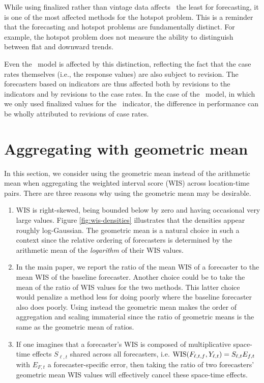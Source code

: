 While using finalized rather than vintage data affects \dv~the least for forecasting,
it is one of the most affected methods for the
hotspot problem. 
This is a reminder that the forecasting and hotspot problems are fundamentally
distinct.  For example, the hotspot problem does not measure
the ability to distinguish between flat and downward trends.

Even the \ar~model is affected by this distinction, reflecting the
fact that the case rates themselves (i.e., the response values) are also
subject to revision.  The forecasters based on indicators are thus
affected both by revisions to the indicators and by revisions to the
case rates.  In the case of the \gs~model, in which we only used finalized
values for the \gs~indicator, the difference in performance can be
wholly attributed to revisions of case rates.




\section{Aggregating with geometric mean}

In this section, we consider using the geometric mean instead of the
arithmetic mean when aggregating the weighted interval score (WIS) across
location-time pairs. 
There are three reasons why using the geometric mean may be desirable.
\begin{enumerate}
\item  WIS is right-skewed, being bounded below by zero and having
  occasional very large values.   Figure \ref{fig:wis-densities} illustrates that the
  densities appear roughly log-Gaussian.  The geometric mean is a
  natural choice in such a context since the relative ordering of forecasters is
  determined by the arithmetic mean of the {\em logarithm} of their WIS
  values.
\item In the main paper, we report the ratio of the mean WIS of a
  forecaster to the mean WIS of the baseline forecaster. Another
  choice could be to take the mean of the ratio of WIS values for the
  two methods. This latter choice would penalize a method less for
  doing poorly where the baseline forecaster also does poorly.
  Using instead the geometric mean makes the order of aggregation and
  scaling immaterial since the ratio of geometric means is the same as
  the geometric mean of ratios.
\item If one imagines that a forecaster's WIS is composed of
  multiplicative space-time effects $S_{\ell,t}$ shared across all forecasters,
  i.e. $\mathrm{WIS}(F_{\ell,t,f},Y_{\ell,t})=S_{\ell,t}E_{f,t}$ with $E_{F,t}$ a
  forecaster-specific error, then
  taking the ratio of two forecasters' geometric mean WIS values will
  effectively cancel these space-time effects.
\end{enumerate}

